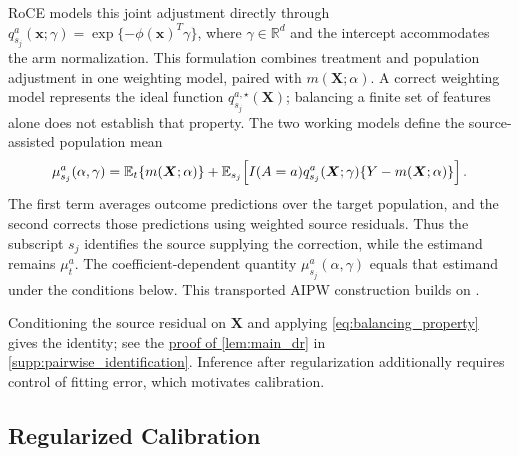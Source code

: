 \documentclass[12pt]{article}
\begin{document}
RoCE models this joint adjustment directly through $q_{s_j}^a(\boldsymbol x;\gamma)=\exp\{-\phi(\boldsymbol x)^T\gamma\}$, where $\gamma\in\mathbb R^d$ and the intercept accommodates the arm normalization. This formulation combines treatment and population adjustment in one weighting model, paired with $m(\boldsymbol X;\alpha)$. A correct weighting model represents the ideal function $q_{s_j}^{a,\star}(\boldsymbol X)$; balancing a finite set of features alone does not establish that property. The two working models define the source-assisted population mean
\begin{equation}\label{eq:main_source_functional}
\mu_{s_j}^a(\alpha,\gamma)
=\mathbb{E}_t\{m(\boldsymbol X;\alpha)\}
+\mathbb{E}_{s_j}\!\left[I(A=a)q_{s_j}^a(\boldsymbol X;\gamma)
\{Y-m(\boldsymbol X;\alpha)\}\right].
\end{equation}
The first term averages outcome predictions over the target population, and the second corrects those predictions using weighted source residuals. Thus the subscript $s_j$ identifies the source supplying the correction, while the estimand remains $\mu_t^a$. The coefficient-dependent quantity $\mu_{s_j}^a(\alpha,\gamma)$ equals that estimand under the conditions below. This transported AIPW construction builds on \citet{josey2022calibration,han2025federated}.

\begin{lemma}\label{lem:main_dr}
\FACEHDSourceIdentification
\end{lemma}
Conditioning the source residual on $\boldsymbol X$ and applying \cref{eq:balancing_property} gives the identity; see the \hyperref[proof:main_dr]{proof of \cref*{lem:main_dr}} in \cref{supp:pairwise_identification}. Inference after regularization additionally requires control of fitting error, which motivates calibration.

\subsection{Regularized Calibration}\label{sec:calibration}
\end{document}
